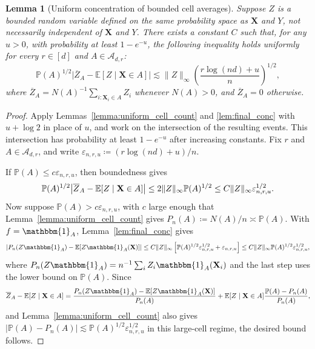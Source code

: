 \documentclass[11pt]{article}
\theoremstyle{plain}
\newtheorem{lemma}[theorem]{Lemma}
\theoremstyle{definition}
\theoremstyle{remark}
\theoremstyle{plain}
\newcommand{\bX}{\mathbf{X}}
\DeclarePairedDelimiter{\abs}{|}{|}
\DeclarePairedDelimiter{\norm}{\|}{\|}
\renewcommand{\P}{\mathbb{P}}
\newcommand{\E}{\mathbb{E}}
\newcommand{\1}{\mathbbm{1}}
\begin{document}
\begin{lemma}[Uniform concentration of bounded cell averages]
\label{lemma:unif_conc_bounded_cell_ave}
Suppose $Z$ is a bounded random variable defined on the same probability
space as $\bX$ and $Y$, not necessarily independent of $\bX$ and $Y$.
There exists a constant $C$ such that, for any $u>0$, with probability at
least $1-e^{-u}$, the following inequality holds uniformly for every
$r\in[d]$ and $A\in\mathcal{A}_{d,r}$:
\begin{equation}
\label{eq:conclude-bounded-cell-mean}
\P(A)^{1/2}
\bigl|\overline Z_A-\E[Z\mid \bX\in A]\bigr|
\lesssim
\|Z\|_\infty
\left(\frac{r\log(nd)+u}{n}\right)^{1/2},
\end{equation}
where $\overline Z_A=N(A)^{-1}\sum_{i:\bX_i\in A} Z_i$ whenever
$N(A)>0$, and $\overline Z_A=0$ otherwise.
\end{lemma}

\begin{proof}
Apply Lemmas~\ref{lemma:uniform_cell_count} and \ref{lem:final_conc}
with $u+\log 2$ in place of $u$, and work on the intersection of the
resulting events.  This intersection has probability at least
$1-e^{-u}$ after increasing constants.
Fix $r$ and $A\in\mathcal{A}_{d,r}$, and write
$\varepsilon_{n,r,u}\coloneqq (r\log(nd)+u)/n$.

If $\P(A)\leq c\varepsilon_{n,r,u}$, then boundedness gives
\[
\P(A)^{1/2}
\bigl|\overline Z_A-\E[Z\mid \bX\in A]\bigr|
\leq
2\norm{Z}_\infty \P(A)^{1/2}
\leq
C\norm{Z}_\infty\varepsilon_{n,r,u}^{1/2}.
\]
Now suppose $\P(A)>c\varepsilon_{n,r,u}$, with $c$ large enough that
Lemma~\ref{lemma:uniform_cell_count} gives
$P_n(A)\coloneqq N(A)/n\asymp \P(A)$.
With $f=\1_A$, Lemma~\ref{lem:final_conc} gives
\[
\abs*{P_n(Z\1_A)-\E[Z\1_A(\bX)]}
\leq
C\norm{Z}_\infty
\left[
\P(A)^{1/2}\varepsilon_{n,r,u}^{1/2}
+\varepsilon_{n,r,u}
\right]
\leq
C\norm{Z}_\infty
\P(A)^{1/2}\varepsilon_{n,r,u}^{1/2},
\]
where $P_n(Z\1_A)=n^{-1}\sum_i Z_i\1_A(\bX_i)$ and the last step uses the
lower bound on $\P(A)$.
Since
\[
\overline Z_A-\E[Z\mid \bX\in A]
=
\frac{P_n(Z\1_A)-\E[Z\1_A(\bX)]}{P_n(A)}
+\E[Z\mid \bX\in A]\frac{\P(A)-P_n(A)}{P_n(A)},
\]
and Lemma~\ref{lemma:uniform_cell_count} also gives
$|\P(A)-P_n(A)|\lesssim \P(A)^{1/2}\varepsilon_{n,r,u}^{1/2}$ in this
large-cell regime, the desired bound follows.
\end{proof}
\end{document}
